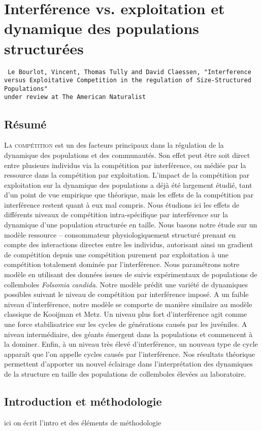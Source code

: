 \chapter[Interférence vs. exploitation et dynamique des populations
structurées][Interférence et populations structurées]{Interférence vs.
exploitation et dynamique des populations structurées}

\vspace{2cm}
\begin{Spacing}{1}
\texttt{
Le Bourlot, Vincent, Thomas Tully and David Claessen, "Interference versus
Exploitative Competition in the regulation of Size-Structured Populations"\\
under review at The American Naturalist
}
\end{Spacing}

\section*{Résumé}


\lettrine[lines=3]{L}{a compétition}  est un des facteurs principaux dans la
régulation de la dynamique des populations et des communautés. Son effet peut
être soit direct entre plusieurs individus via la compétition par
interférence, ou médiée par la ressource dans la compétition par
exploitation. L'impact de la compétition par exploitation sur la dynamique des
populations a déjà été largement étudié, tant d'un point de vue empirique
que théorique, mais les effets de la compétition par interférence restent
quant à eux mal compris. Nous étudions ici les effets de différents niveaux
de compétition intra-spécifique par interférence sur la dynamique d'une
population structurée en taille. Nous basons notre étude sur un modèle
ressource -- consommateur physiologiquement structuré prenant en compte des
interactions directes entre les individus, autorisant ainsi un gradient de
compétition depuis une compétition purement par exploitation à une
compétition totalement dominée par l'interférence. Nous paramétrons notre
modèle en utilisant des données issues de suivis expérimentaux de populations
de collemboles \textit{Folsomia candida}. Notre modèle prédit une variété de
dynamiques possibles suivant le niveau de compétition par interférence
imposé. A un faible niveau d'interférence, notre modèle se comporte de
manière similaire au modèle classique de Kooijman et Metz. Un niveau plus fort
d'interférence agit comme une force stabilisatrice sur les cycles de
générations causés par les juvéniles. A niveau intermédiaire, des géants
émergent dans la populations et commencent à la dominer. Enfin, à un niveau
très élevé d'interférence, un nouveau type de cycle apparaît que l'on
appelle cycles causés par l'interférence. Nos résultats théorique permettent
d'apporter un nouvel éclairage dans l'interprétation des dynamiques de la
structure en taille des populations de collemboles élevées au laboratoire.

\section{Introduction et méthodologie}

ici on écrit l'intro et des éléments de méthodologie

